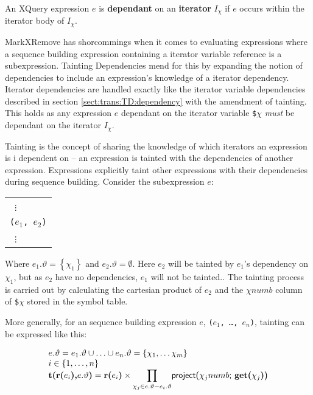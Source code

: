 \noindent
\begin{myDefinition}
An XQuery expression $e$ is \textbf{dependant} on an \textbf{iterator} $I_{\chi}$ if $e$ occurs within the iterator
body of $I_{\chi}$.
\label{def:iteratorDep}
\end{myDefinition}

MarkXRemove has shorcommings when it comes to evaluating expressions where a sequence building expression
containing a iterator variable reference is a subexpression. Tainting Dependencies mend for this by expanding the
notion of dependencies to include an expression's knowledge of a iterator dependency. Iterator dependencies are
handled exactly like the iterator variable dependencies described in section \ref{sect:trans:TD:dependency} with
the amendment of tainting. This holds as any expression $e$ dependant on the iterator variable \texttt{\$}$\chi$
\textit{must} be dependant on the iterator $I_{\chi}$.

Tainting is the concept of sharing the knowledge of which iterators an expression is i dependent on -- an
expression is tainted with the dependencies of another expression. Expressions explicitly taint other expressions
with their dependencies during sequence building. Consider the subexpression $e$:
\begin{center}
\begin{tabular}{l}
\quad \;\, $\vdots$  \\
\texttt{(}$e_{1}$\texttt{, }$e_{2}$\texttt{)}\\
\quad \;\, $\vdots$  
\end{tabular}
\end{center}
Where $e_{1}.\vartheta = \left\{\chi_{1}\right\}$ and $e_{2}.\vartheta = \emptyset$. Here $e_{2}$ will be tainted
by $e_{1}$'s dependency on $\chi_{1}$, but as $e_{2}$ have no dependencies, $e_{1}$ will not be tainted.. The
tainting process is carried out by calculating the cartesian product of $e_{2}$ and the $\chi$$numb$ column of
\texttt{\$}$\chi$ stored in the symbol table.

More generally, for an sequence building expression $e$, \texttt{(}$e_{1}$\texttt{, \ldots, }$e_{n}$\texttt{)},
tainting can be expressed like this: 
\begin{center}
\begin{equation}
\begin{array}{l}
e.\vartheta = e_{1}.\vartheta \cup \ldots \cup e_{n}.\vartheta = \left\{\chi_{1},\ldots\chi_{m}\right\} \\
i \in \left\{1,\ldots,n\right\} \\
\mbox{\textbf{t(r(}}e_{i}\mbox{\textbf{),}}e.\vartheta\mbox{\textbf{)}} = 
\mbox{\textbf{r(}}e_{i}\mbox{\textbf{)}} \times {\displaystyle \prod_{\chi_{j} \in e.\vartheta -
e_{i}.\vartheta}} \mbox{\textsf{project(}}\chi_{j}numb\mbox{\textsf{;
}\textbf{get(}}\chi_{j}\mbox{\textbf{)}\textsf{)}}
\end{array}
\label{eq:trans:TD:taint}
\end{equation}
\end{center}

